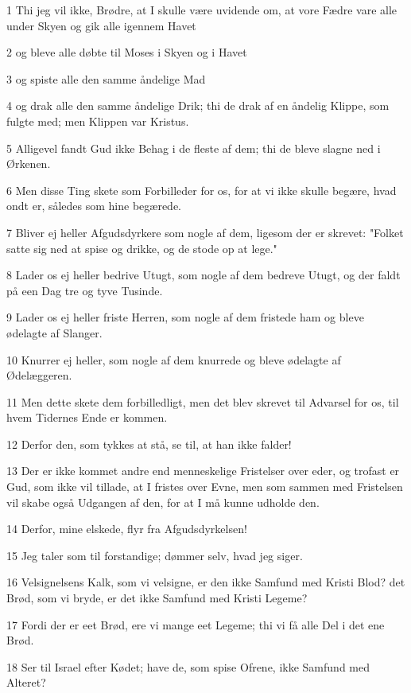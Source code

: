 \par 1 Thi jeg vil ikke, Brødre, at I skulle være uvidende om, at vore Fædre vare alle under Skyen og gik alle igennem Havet
\par 2 og bleve alle døbte til Moses i Skyen og i Havet
\par 3 og spiste alle den samme åndelige Mad
\par 4 og drak alle den samme åndelige Drik; thi de drak af en åndelig Klippe, som fulgte med; men Klippen var Kristus.
\par 5 Alligevel fandt Gud ikke Behag i de fleste af dem; thi de bleve slagne ned i Ørkenen.
\par 6 Men disse Ting skete som Forbilleder for os, for at vi ikke skulle begære, hvad ondt er, således som hine begærede.
\par 7 Bliver ej heller Afgudsdyrkere som nogle af dem, ligesom der er skrevet: "Folket satte sig ned at spise og drikke, og de stode op at lege."
\par 8 Lader os ej heller bedrive Utugt, som nogle af dem bedreve Utugt, og der faldt på een Dag tre og tyve Tusinde.
\par 9 Lader os ej heller friste Herren, som nogle af dem fristede ham og bleve ødelagte af Slanger.
\par 10 Knurrer ej heller, som nogle af dem knurrede og bleve ødelagte af Ødelæggeren.
\par 11 Men dette skete dem forbilledligt, men det blev skrevet til Advarsel for os, til hvem Tidernes Ende er kommen.
\par 12 Derfor den, som tykkes at stå, se til, at han ikke falder!
\par 13 Der er ikke kommet andre end menneskelige Fristelser over eder, og trofast er Gud, som ikke vil tillade, at I fristes over Evne, men som sammen med Fristelsen vil skabe også Udgangen af den, for at I må kunne udholde den.
\par 14 Derfor, mine elskede, flyr fra Afgudsdyrkelsen!
\par 15 Jeg taler som til forstandige; dømmer selv, hvad jeg siger.
\par 16 Velsignelsens Kalk, som vi velsigne, er den ikke Samfund med Kristi Blod? det Brød, som vi bryde, er det ikke Samfund med Kristi Legeme?
\par 17 Fordi der er eet Brød, ere vi mange eet Legeme; thi vi få alle Del i det ene Brød.
\par 18 Ser til Israel efter Kødet; have de, som spise Ofrene, ikke Samfund med Alteret?
